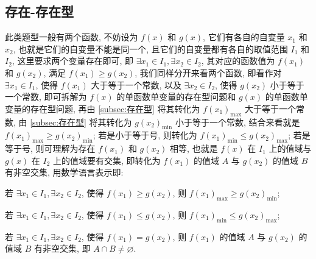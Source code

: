 \subsection{存在-存在型}\label{subsec:2.4存在-存在型}
此类题型一般有两个函数, 不妨设为 \(f(x)\) 和 \(g(x)\), 它们有各自的自变量 \({x}_{1}\) 和 \({x}_{2}\), 也就是它们的自变量不能是同一个, 且它们的自变量都有各自的取值范围 \({I}_{1}\) 和 \({I}_{2}\), 这里要求两个变量存在即可, 即 \(\exists {x}_{1} \in  {I}_{1}, \exists {x}_{2} \in  {I}_{2}\), 其对应的函数值为 \(f\left( {x}_{1}\right)\) 和 \(g\left( {x}_{2}\right)\), 满足 \(f\left( {x}_{1}\right)  \geq  g\left( {x}_{2}\right)\), 我们同样分开来看两个函数, 即看作对 \(\exists {x}_{1} \in  {I}_{1}\), 使得 \(f\left( {x}_{1}\right)\) 大于等于一个常数, 以及 \(\exists {x}_{2} \in  {I}_{2}\), 使得 \(g\left( {x}_{2}\right)\) 小于等于一个常数, 即可拆解为 \(f(x)\) 的单函数单变量的存在型问题和 \(g(x)\) 的单函数单变量的存在型问题, 再由 \ref{subsec:存在型} 将其转化为 \(f{\left( {x}_{1}\right) }_{\max }\) 大于等于一个常数, 由 \ref{subsec:存在型} 将其转化为 \(g{\left( {x}_{2}\right) }_{\min }\) 小于等于一个常数, 结合来看就是 \(f{\left( {x}_{1}\right) }_{\max } \geq  g{\left( {x}_{2}\right) }_{\min }\); 若是小于等于号, 则转化为 \(f{\left( {x}_{1}\right) }_{\min } \leq  g{\left( {x}_{2}\right) }_{\max }\); 若是等于号, 则可理解为存在 \(f\left( {x}_{1}\right)\) 和 \(g\left( {x}_{2}\right)\) 相等, 也就是 \(f(x)\) 在 \({I}_{1}\) 上的值域与 \(g(x)\) 在 \({I}_{2}\) 上的值域要有交集, 即转化为 \(f\left( {x}_{1}\right)\) 的值域 \(A\) 与 \(g\left( {x}_{2}\right)\) 的值域 \(B\) 有非空交集, 用数学语言表示即:


\begin{type}\label{type:20}
  若 \(\exists {x}_{1} \in  {I}_{1}, \exists {x}_{2} \in  {I}_{2}\), 使得 \(f\left( {x}_{1}\right)  \geq  g\left( {x}_{2}\right)\), 则 \(f{\left( {x}_{1}\right) }_{\max } \geq  g{\left( {x}_{2}\right) }_{\min }\);
\end{type}

\begin{type}\label{type:21}
  若 \(\exists {x}_{1} \in  {I}_{1}, \exists {x}_{2} \in  {I}_{2}\), 使得 \(f\left( {x}_{1}\right)  \leq  g\left( {x}_{2}\right)\), 则 \(f{\left( {x}_{1}\right) }_{\min } \leq  g{\left( {x}_{2}\right) }_{\max }\);
\end{type}

\begin{type}\label{type:22}
  若 \(\exists {x}_{1} \in  {I}_{1}, \exists {x}_{2} \in  {I}_{2}\), 使得 \(f\left( {x}_{1}\right)  = g\left( {x}_{2}\right)\), 则 \(f\left( {x}_{1}\right)\) 的值域 \(A\) 与 \(g\left( {x}_{2}\right)\) 的值域 \(B\) 有非空交集, 即 \(A \cap  B \neq  \varnothing\).
\end{type}

